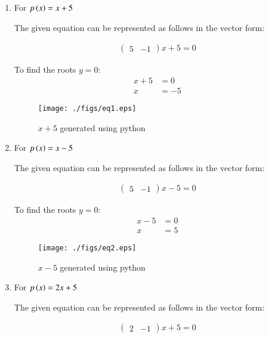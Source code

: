 \renewcommand{\theequation}{\theenumi}
\begin{enumerate}[label=\thesection.\arabic*.,ref=\thesection.\theenumi]

\item \solution For $p\left(x\right) = x + 5$ 
\begin{flushleft}
The given equation can be represented as follows in the vector form:
\end{flushleft}
\begin{align}
\begin{pmatrix}
5 & -1 
\end{pmatrix}
x + 5 = 0
\end{align}

To find the roots $y=0$:
\begin{align}
x + 5 &= 0 \\
x &= -5
\end{align}
\begin{figure}[!ht]
\centering
\texttt{[image: ./figs/eq1.eps]}
\caption{$x + 5$ generated using python}
\label{fig:eq1}
\end{figure} 
\item \solution For $p\left(x\right) = x - 5$
\begin{flushleft}
The given equation can be represented as follows in the vector form:
\end{flushleft}
\begin{align}
\begin{pmatrix}
5 & -1 
\end{pmatrix}
x - 5 = 0
\end{align}

To find the roots $y=0$:
\begin{align}
x - 5 &= 0 \\
x &= 5
\end{align}
\begin{figure}[!ht]
\centering
\texttt{[image: ./figs/eq2.eps]}
\caption{$x - 5$ generated using python}
\label{fig:eq2}
\end{figure}
\pagebreak
\item \solution For $p\left(x\right) = 2x + 5$
\begin{flushleft}
The given equation can be represented as follows in the vector form:
\end{flushleft}
\begin{align}
\begin{pmatrix}
2 & -1 
\end{pmatrix}
x + 5 = 0
\end{align}


\end{enumerate}

